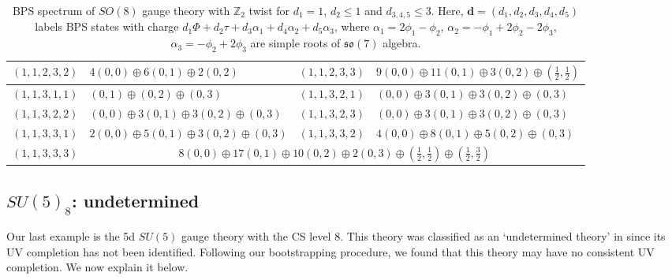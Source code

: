 \begin{table}
\begin{tabular}{|c|C{23ex}||c|C{23ex}|}
		$ (1, 1, 2, 3, 2) $ & $ \! 4(0, 0) \oplus 6(0, 1) \oplus 2(0, 2) \! $ & $ (1, 1, 2, 3, 3) $ & $ 9(0, 0) \oplus 11(0, 1) \oplus 3(0, 2) \oplus (\frac{1}{2}, \frac{1}{2}) $ \\ \hline
		$ (1, 1, 3, 1, 1) $ & $ (0, 1) \oplus (0, 2) \oplus (0, 3) $ & $ (1, 1, 3, 2, 1) $ & $ (0, 0) \oplus 3(0, 1) \oplus 3(0, 2) \oplus (0, 3) $ \\ \hline
		$ (1, 1, 3, 2, 2) $ & $ (0, 0) \oplus 3(0, 1) \oplus 3(0, 2) \oplus (0, 3) $ & $ (1, 1, 3, 2, 3) $ & $ (0, 0) \oplus 3(0, 1) \oplus 3(0, 2) \oplus (0, 3) $ \\ \hline
		$ (1, 1, 3, 3, 1) $ & $ 2(0, 0) \oplus 5(0, 1) \oplus 3(0, 2) \oplus (0, 3) $ & $ (1, 1, 3, 3, 2) $ & $ 4(0, 0) \oplus 8(0, 1) \oplus 5(0, 2) \oplus (0, 3) $ \\ \hline
		$ (1, 1, 3, 3, 3) $ &  \\ \hline
	\end{tabular}
	\caption{BPS spectrum of $ SO(8) $ gauge theory with $ \mathbb{Z}_2 $ twist for $ d_1 = 1 $, $ d_2 \leq 1 $ and $ d_{3,4, 5} \leq 3 $. Here, $ \mathbf{d} = (d_1, d_2, d_3, d_4, d_5) $ labels BPS states with charge $ d_1 \Phi + d_2 \tau + d_3 \alpha_1 + d_4 \alpha_2 + d_5 \alpha_3 $, where $ \alpha_1 = 2\phi_1-\phi_2 $, $ \alpha_2 = -\phi_1 + 2\phi_2 - 2\phi_3 $, $ \alpha_3 = -\phi_2 + 2\phi_3 $ are simple roots of $ \mathfrak{so}(7) $ algebra.} \label{table:SO8/Z2}
\end{table}


\subsection{\texorpdfstring{$ SU(5)_8 $: undetermined}{SU(5)8}}

Our last example is the 5d $ SU(5) $ gauge theory with the CS level $ 8 $. This theory was classified as an `undetermined theory' in \cite{Bhardwaj:2020gyu} since its UV completion has not been identified. Following our bootstrapping procedure, we found that this theory may have no consistent UV completion. We now explain it below.

